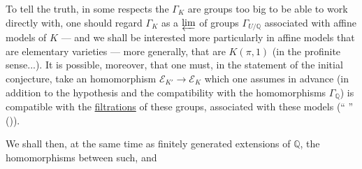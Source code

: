 To tell the truth, in some respects the $\Gamma_K$ are groups too big to be able to work directly with, one should regard $\Gamma_K$ as a $\varprojlim$ of groups $\Gamma_{U/\mathbb Q}$ associated with affine models of $K$ --- and we shall be interested more particularly in affine models that are elementary varieties --- more generally, that are $K(\pi,1)$ (in the profinite sense...). It is possible, moreover, that one must, in the statement of the initial conjecture, take an  homomorphism $\mathcal E_{K'}\longrightarrow\mathcal E_K$ which one assumes in advance (in addition to the  hypothesis and the compatibility with the homomorphisms  $\Gamma_{\mathbb Q}$) is compatible with the \uline{filtrations} of these groups, associated with these models (`` '' ()).

We shall then, at the same time as finitely generated extensions of $\mathbb Q$, the homomorphisms between such, and
